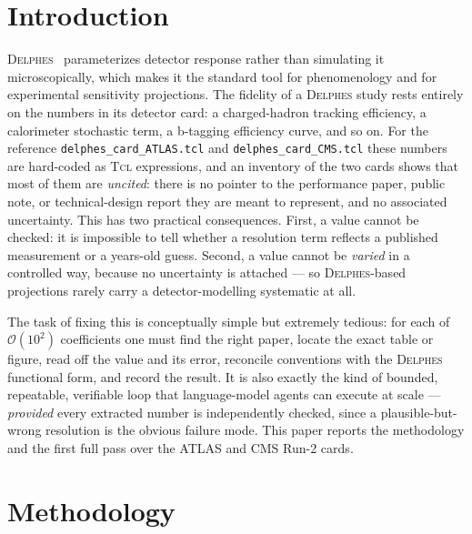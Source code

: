 \documentclass[11pt,a4paper]{article}
\begin{document}
\section{Introduction}
\textsc{Delphes}~\cite{delphes} parameterizes detector response rather than
simulating it microscopically, which makes it the standard tool for phenomenology
and for experimental sensitivity projections. The fidelity of a \textsc{Delphes}
study rests entirely on the numbers in its detector card: a charged-hadron
tracking efficiency, a calorimeter stochastic term, a b-tagging efficiency curve,
and so on. For the reference \texttt{delphes\_card\_ATLAS.tcl} and
\texttt{delphes\_card\_CMS.tcl} these numbers are hard-coded as \textsc{Tcl}
expressions, and an inventory of the two cards shows that most of them are
\emph{uncited}: there is no pointer to the performance paper, public note, or
technical-design report they are meant to represent, and no associated
uncertainty. This has two practical consequences. First, a value cannot be
checked: it is impossible to tell whether a resolution term reflects a published
measurement or a years-old guess. Second, a value cannot be \emph{varied} in a
controlled way, because no uncertainty is attached --- so \textsc{Delphes}-based
projections rarely carry a detector-modelling systematic at all.

The task of fixing this is conceptually simple but extremely tedious: for each
of $\mathcal{O}(10^2)$ coefficients one must find the right paper, locate the
exact table or figure, read off the value and its error, reconcile conventions
with the \textsc{Delphes} functional form, and record the result. It is also
exactly the kind of bounded, repeatable, verifiable loop that language-model
agents can execute at scale --- \emph{provided} every extracted number is
independently checked, since a plausible-but-wrong resolution is the obvious
failure mode. This paper reports the methodology and the first full pass over
the ATLAS and CMS Run-2 cards.

\section{Methodology}
\end{document}
